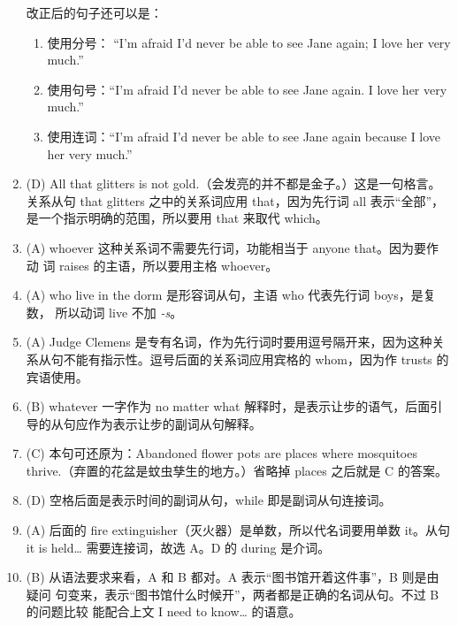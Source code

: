 \begin{enumerate}
{    改正后的句子还可以是：
    \begin{enumerate}

    \item 使用分号： “I'm afraid I'd never be able to see Jane again; I love
      her very much.”
    \item 使用句号：“I'm afraid I'd never be able to see Jane again. I love
      her very much.”
    \item 使用连词：“I'm afraid I'd never be able to see Jane again because I
      love her very much.”
    \end{enumerate}
  }

\item (D) All that glitters is not gold.（会发亮的并不都是金子。）这是一句格言。
  关系从句 that glitters 之中的关系词应用 that，因为先行词 all 表示“全部”，
  是一个指示明确的范围，所以要用 that 来取代 which。

\item (A) whoever 这种关系词不需要先行词，功能相当于 anyone that。因为要作动
  词 raises 的主语，所以要用主格 whoever。

\item  (A) who live in the dorm 是形容词从句，主语 who 代表先行词 boys，是复数， 所以动词 live 不加 \emph{-s}。
\item (A) Judge Clemens 是专有名词，作为先行词时要用逗号隔开来，因为这种关系从句不能有指示性。逗号后面的关系词应用宾格的 whom，因为作 trusts 的宾语使用。

\item (B) whatever 一字作为 no matter what 解释时，是表示让步的语气，后面引导的从句应作为表示让步的副词从句解释。

\item (C) 本句可还原为：Abandoned flower pots are places where mosquitoes thrive.（弃置的花盆是蚊虫孳生的地方。）省略掉 places 之后就是 C 的答案。


\item (D) 空格后面是表示时间的副词从句，while 即是副词从句连接词。

\item  (A) 后面的 fire extinguisher（灭火器）是单数，所以代名词要用单数 it。从句 it is held… 需要连接词，故选 A。D 的 during 是介词。
\item (B) 从语法要求来看，A 和 B 都对。A 表示“图书馆开着这件事”，B 则是由疑问
  句变来，表示“图书馆什么时候开”，两者都是正确的名词从句。不过 B 的问题比较
  能配合上文 I need to know… 的语意。
\end{enumerate}

